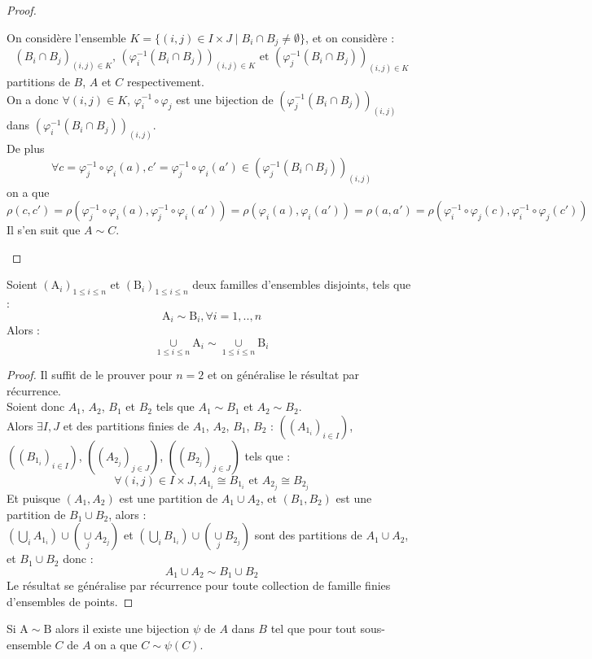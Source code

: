 \begin{proof}
\begin{itemize}
    On considère l'ensemble $K=\{ (i,j) \in I \times J \mid B_i\cap B_j\neq \emptyset \}$, et on considère :\\
    $$(B_i\cap B_j)_{(i,j)\in K} \text{, } (\varphi_i^{-1}(B_i\cap B_j))_{(i,j)\in K}\text{ et } (\varphi_j^{-1}(B_i\cap B_j))_{(i,j)\in K}$$ partitions de $B$, $A$ et $C$ respectivement.\\
     On a donc $\forall (i,j)\in K$,
     $\varphi_i^{-1} \circ \varphi_j$ est une bijection de $(\varphi_j^{-1}(B_i\cap B_j))_{(i,j)}$ dans $(\varphi_i^{-1}(B_i\cap B_j))_{(i,j)}$.\\ De plus $$\forall c=\varphi_j^{-1} \circ \varphi_i(a),c'=\varphi_j^{-1} \circ \varphi_i(a') \in (\varphi_j^{-1}(B_i\cap B_j))_{(i,j)}$$
     on a que
    $$\mathcal{\rho}(c, c') = \mathcal{\rho}(\varphi_j^{-1} \circ \varphi_i(a), \varphi_j^{-1} \circ \varphi_i(a'))=\mathcal{\rho}(\varphi_i(a), \varphi_i(a')) =\mathcal{\rho}\left(a,a'\right) = \mathcal{\rho}(\varphi_i^{-1} \circ \varphi_j(c), \varphi_i^{-1} \circ \varphi_j(c'))$$
    Il s'en  suit que $A \sim C$.
  \end{itemize}
\end{proof}
\begin{PR}\label{p3}
   Soient $\left(\mathrm{A}_i\right)_{1\le i \le n}$ et $\left(\mathrm{B}_i\right)_{1\le i \le n}$ deux familles d'ensembles disjoints, tels que :
   $$\mathrm{A}_i \sim \mathrm{B}_i, \forall i=1,..,n$$
   Alors : $$\underset{1\le i \le n}{\cup} \mathrm{A}_i \sim \underset{1\le i \le n}{\cup} \mathrm{B}_i$$
\end{PR}
\begin{proof}
Il suffit de le prouver pour $n=2$ et on généralise le résultat par récurrence.\\ Soient donc $A_1$, $A_2$, $B_1$ et $B_2$ tels que $A_1 \sim B_1$ et $A_2 \sim B_2$.\\
Alors $\exists I, J$ et des partitions finies de $A_1$, $A_2$, $B_1$, $B_2$ :
$((A_{1_i})_{i \in I})$, $((B_{1_i})_{i \in I})$, $((A_{2_j})_{j \in J})$, $((B_{2_j})_{j \in J})$ tels que :
$$\forall (i,j) \in I\times J, A_{1_i} \cong B_{1_i} \text{ et } A_{2_j} \cong B_{2_j}$$
Et puisque $(A_1, A_2)$ est une partition de $A_1\cup A_2$, et $(B_1, B_2)$ est une partition de $B_1\cup B_2$, alors :\\
$\left(\underset{i}{\bigcup} A_{1_i} \right) \cup \left(\underset{j}{\cup} A_{2_j}\right)$ et $\left(\underset{i}{\bigcup} B_{1_i} \right) \cup \left(\underset{j}{\cup} B_{2_j}\right)$ sont des partitions de  $A_1\cup A_2$, et $B_1\cup B_2$ donc : $$A_1 \cup A_2 \sim B_1 \cup B_2$$
Le résultat se généralise par récurrence pour toute collection de famille finies d'ensembles de points.
\end{proof}
\begin{PR}\label{p4}
  Si $\mathrm{A} \sim \mathrm{B}$ alors il existe une bijection $\psi$ de $A$ dans $B$ tel que pour tout sous-ensemble $C$ de $A$ on a que $C \sim \psi(C)$.
\end{PR}

